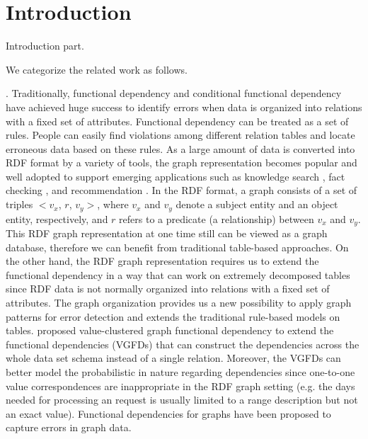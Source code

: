 

\section{Introduction}
\label{sec-intro}

Introduction part.


 We categorize the related work as follows.

. Traditionally, functional dependency \cite{kolahi2009approximating} and conditional functional dependency \cite{bohannon2007conditional} have achieved huge success to identify errors when data is organized into relations with a fixed set of attributes. Functional dependency can be treated as a set of rules. People can easily find violations among different relation tables and locate erroneous data based on these rules. As a large amount of data is converted into RDF format by a variety of tools, the graph representation becomes popular and well adopted to support emerging applications such as knowledge search \cite{jindal2014review},  fact checking \cite{fionda2018fact}, and recommendation \cite{zhang2016collaborative}. In the RDF format, a graph consists of a set of triples $<v_x$, $r$, $v_y>$, where $v_x$ and $v_y$ denote a subject entity and an object entity, respectively, and $r$ refers to a predicate (a relationship) between $v_x$ and $v_y$.
This RDF graph representation at one time still can be viewed as a graph database, therefore we can benefit from traditional table-based approaches. On the other hand, the RDF graph representation requires us to extend the functional dependency in a way that can work on extremely decomposed tables since RDF data is not normally organized into relations with a fixed set of attributes. The graph 
organization provides us a new possibility to apply graph patterns for error detection and extends the traditional rule-based models on tables. \cite{yu2011extending} proposed value-clustered graph functional dependency to extend the functional dependencies (VGFDs) that can 
construct the dependencies across the
whole data set schema instead of a single relation. Moreover, the VGFDs can better model the probabilistic in nature regarding dependencies since one-to-one value correspondences are inappropriate in the RDF graph setting (e.g. the days needed for processing an request is usually limited to a range description but not an exact value).
Functional dependencies for graphs \cite{fan2016functional} have been proposed to capture errors in graph data. 
